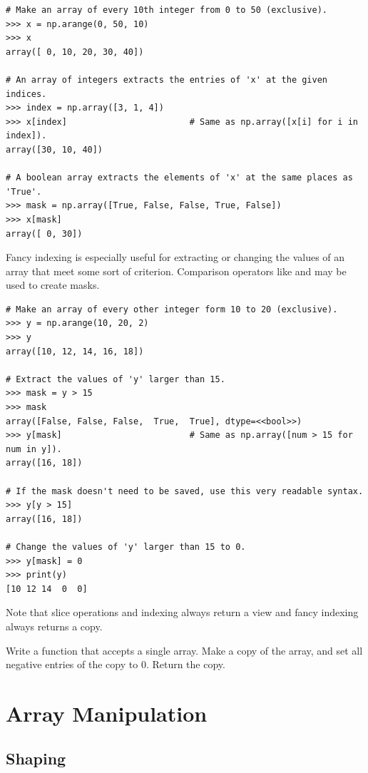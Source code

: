 \begin{lstlisting}
# Make an array of every 10th integer from 0 to 50 (exclusive).
>>> x = np.arange(0, 50, 10)
>>> x
array([ 0, 10, 20, 30, 40])

# An array of integers extracts the entries of 'x' at the given indices.
>>> index = np.array([3, 1, 4])
>>> x[index]                        # Same as np.array([x[i] for i in index]).
array([30, 10, 40])

# A boolean array extracts the elements of 'x' at the same places as 'True'.
>>> mask = np.array([True, False, False, True, False])
>>> x[mask]
array([ 0, 30])
\end{lstlisting}

Fancy indexing is especially useful for extracting or changing the values of an array that meet some sort of criterion.
Comparison operators like \li{<} and \li{==} may be used to create masks.

\begin{lstlisting}
# Make an array of every other integer form 10 to 20 (exclusive).
>>> y = np.arange(10, 20, 2)
>>> y
array([10, 12, 14, 16, 18])

# Extract the values of 'y' larger than 15.
>>> mask = y > 15
>>> mask
array([False, False, False,  True,  True], dtype=<<bool>>)
>>> y[mask]                         # Same as np.array([num > 15 for num in y]).
array([16, 18])

# If the mask doesn't need to be saved, use this very readable syntax.
>>> y[y > 15]
array([16, 18])

# Change the values of 'y' larger than 15 to 0.
>>> y[mask] = 0
>>> print(y)
[10 12 14  0  0]
\end{lstlisting}

Note that slice operations and indexing always return a view and fancy indexing always returns a copy.

\begin{problem} %
Write a function that accepts a single array.
Make a copy of the array, and set all negative entries of the copy to $0$.
Return the copy.
\end{problem}

\section*{Array Manipulation} %

\subsection*{Shaping} %

